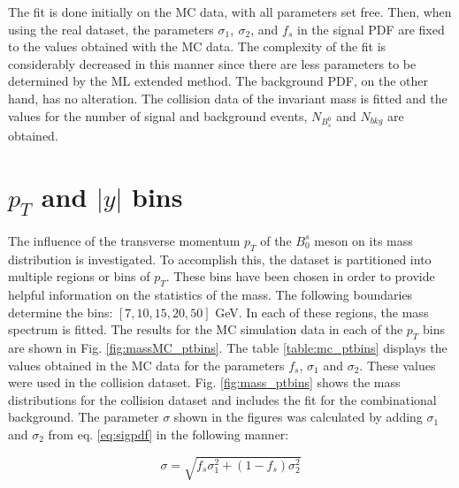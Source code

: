 The fit is done initially on the MC data, with all parameters set free. Then, when using the real dataset, the parameters $\sigma_1, \ \sigma_2$, and $f_s$ in the signal PDF are fixed to the values obtained with the MC data. The complexity of the fit is considerably decreased in this manner since there are less parameters to be determined by the ML extended method. The background PDF, on the other hand, has no alteration. The collision data of the invariant mass is fitted and the values for the number of signal and background events, $N_{B^0_s}$ and $N_{bkg}$ are obtained. 

\section{$p_T$ and $|y|$ bins}

The influence of the transverse momentum $p_T$ of the $B_0^s$ meson on its mass distribution is investigated. To accomplish this, the dataset is partitioned into multiple regions or bins of $p_T$. These bins have been chosen in order to provide helpful information on the statistics of the mass. The following boundaries determine the bins: $[7, 10, 15, 20, 50]$ GeV. In each of these regions, the mass spectrum is fitted. The results for the MC simulation data in each of the $p_T$ bins are shown in Fig. \ref{fig:massMC_ptbins}. The table \ref{table:mc_ptbins} displays the values obtained in the MC data for the parameters $f_s$, $\sigma_1$ and $\sigma_2$. These values were used in the collision dataset. Fig. \ref{fig:mass_ptbins} shows the mass distributions for the collision dataset and includes the fit for the combinational background. The parameter $\sigma$ shown in the figures was calculated by adding $\sigma_1$ and $\sigma_2$ from eq. \ref{eq:sigpdf} in the following manner:

\begin{equation}
	\sigma = \sqrt{f_s \sigma_1^2 + (1-f_s)\sigma_2^2}
\end{equation}


